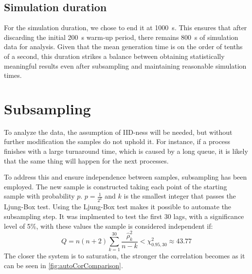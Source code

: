 \subsection{Simulation duration}

For the simulation duration, we chose to end it at \SI{1000}{\second}. This ensures that after discarding the initial \SI{200}{\second} warm-up period, there remains \SI{800}{\second} of simulation data for analysis. Given that the mean generation time is on the order of tenths of a second, this duration strikes a balance between obtaining statistically meaningful results even after subsampling and maintaining reasonable simulation times.


\section{Subsampling}

To analyze the data, the assumption of IID-ness will be needed, but without further modification the samples do not uphold it.
For instance, if a process finishes with a large turnaround time, which is caused by a long queue, it is likely that the same thing will happen for the next processes.

To address this and ensure independence between samples, subsampling has been employed. The new sample is constructed taking each point of the starting sample with probability $p$.
$p = \frac{1}{2^k}$ and $k$ is the smallest integer that passes the Ljung-Box test.
Using the Ljung-Box test makes it possible to automate the subsampling step. It was implmented to test the first 30 lags, with a significance level of 5\%, with these values the sample is considered independent if:
\vspace{-0.5\baselineskip}
\begin{equation}
    Q = n(n+2) \sum_{k=1}^{30} \frac{\hat{\rho}_k^2}{n-k} < \chi^2_{0.95,30} \approx 43.77
\end{equation}
The closer the system is to saturation, the stronger the correlation becomes as it can be seen in \cref{fig:autoCorComparison}.

